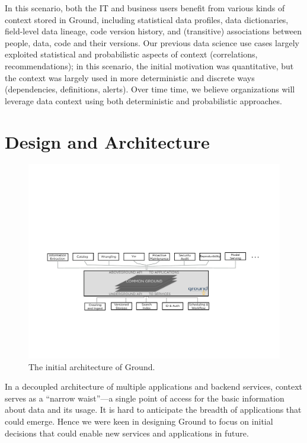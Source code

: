 \documentclass{sig-alternate}
\begin{document}
In this scenario, both the IT and business users benefit from various kinds of context stored in Ground, including statistical data profiles, data dictionaries, field-level data lineage, code version history, and (transitive) associations between people, data, code and their versions. Our previous data science use cases largely exploited statistical and probabilistic aspects of context (correlations, recommendations); in this scenario, the initial motivation was quantitative, but the context was largely used in more deterministic and discrete ways (dependencies, definitions, alerts). Over time time, we believe organizations will leverage data context using both deterministic and probabilistic approaches.

\section{Design and Architecture}
\label{sec:arch}
\begin{figure}[th]
\centering
\includegraphics[width=0.75\linewidth]{groundarch.pdf}
\caption{The initial architecture of Ground.}
\label{fig:arch}
\end{figure}

In a decoupled architecture of multiple applications and backend services, context serves as a ``narrow waist''---a single point of access for the basic information about data and its usage. It is hard to anticipate the breadth of applications that could emerge.
Hence we were keen in designing Ground to focus on initial decisions that could enable new services and applications in future. 
\end{document}

